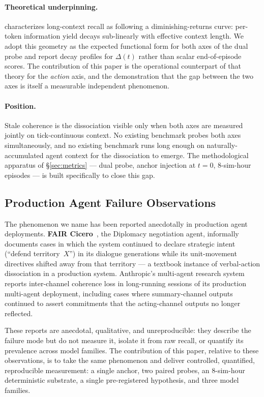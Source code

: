 \paragraph{Theoretical underpinning.}
\citet{Sinha2025IllusionDiminishingReturns} characterizes long-context recall
as following a diminishing-returns curve: per-token information yield decays
sub-linearly with effective context length. We adopt this geometry as the
expected functional form for both axes of the dual probe and report decay
profiles for $\Delta(t)$ rather than scalar end-of-episode scores. The
contribution of this paper is the operational counterpart of that theory for
the \emph{action} axis, and the demonstration that the gap between the two
axes is itself a measurable independent phenomenon.

\paragraph{Position.}
Stale coherence is the dissociation visible only when both axes are measured
jointly on tick-continuous context. No existing benchmark probes both axes
simultaneously, and no existing benchmark runs long enough on
naturally-accumulated agent context for the dissociation to emerge. The
methodological apparatus of \S\ref{sec:metrics} --- dual probe, anchor
injection at $t = 0$, 8-sim-hour episodes --- is built specifically to close
this gap.

\subsection{Production Agent Failure Observations}
\label{sec:rw-production}

The phenomenon we name has been reported anecdotally in production agent
deployments. \textbf{FAIR Cicero}~\citep{FAIR2022Cicero}, the Diplomacy
negotiation agent, informally documents cases in which the system continued
to declare strategic intent (``defend territory~$X$'') in its dialogue
generations while its unit-movement directives shifted away from that
territory --- a textbook instance of verbal-action dissociation in a
production system. Anthropic's multi-agent research
system~\citep{AnthropicMultiAgent2025} reports inter-channel coherence loss
in long-running sessions of its production multi-agent deployment, including
cases where summary-channel outputs continued to assert commitments that the
acting-channel outputs no longer reflected.

These reports are anecdotal, qualitative, and unreproducible: they describe
the failure mode but do not measure it, isolate it from raw recall, or
quantify its prevalence across model families. The contribution of this
paper, relative to these observations, is to take the same phenomenon and
deliver controlled, quantified, reproducible measurement: a single anchor,
two paired probes, an 8-sim-hour deterministic substrate, a single
pre-registered hypothesis, and three model families.
